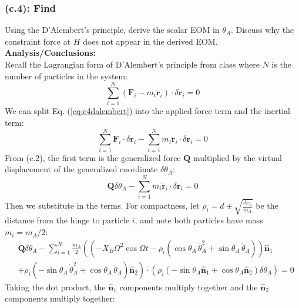 \documentclass[titlepage]{article}
\begin{document}
\subsubsection*{(c.4): Find}
Using the D'Alembert's principle, derive the scalar EOM in $\theta_A$. Discuss why the constraint force at $H$ does not appear in the derived EOM.\\

\textbf{Analysis/Conclusions:}\\
Recall the Lagrangian form of D'Alembert's principle from class where $N$ is the number of particles in the system:
\begin{equation}
	\sum_{i=1}^{N}\left(\boldsymbol{F}_i-m_i\ddot{\boldsymbol{r}}_i\right)\cdot\delta\boldsymbol{r}_i=0
	\label{eq:c4dalembert}
\end{equation}
We can split Eq. (\ref{eq:c4dalembert}) into the applied force term and the inertial term:
\begin{equation}
	\sum_{i=1}^{N}\boldsymbol{F}_i\cdot\delta\boldsymbol{r}_i-\sum_{i=1}^{N}m_i\ddot{\boldsymbol{r}}_i\cdot\delta\boldsymbol{r}_i=0
\end{equation}
From (c.2), the first term is the generalized force $\boldsymbol{Q}$ multiplied by the virtual displacement of the generalized coordinate $\delta\theta_A$:
\begin{equation}
	\boldsymbol{Q}\delta\theta_A-\sum_{i=1}^{N}m_i\ddot{\boldsymbol{r}}_i\cdot\delta\boldsymbol{r}_i=0
	\label{eq:c4split}
\end{equation}
Then we substitute in the terms. For compactness, let $\rho_i=d\pm\sqrt{\frac{J_{C_A}}{m_A}}$ be the distance from the hinge to particle $i$, and note both particles have mass $m_i=m_A/2$:
\begin{equation}
	\begin{split}
		&\boldsymbol{Q}\delta\theta_A-\sum_{i=1}^{N}\frac{m_A}{2}\left(\left(-X_B\Omega^2\cos\Omega t-\rho_i\left(\cos\theta_A\,\dot{\theta}_A^2+\sin\theta_A\,\ddot{\theta}_A\right)\right)\hat{\boldsymbol{n}}_1\right. \\
		&\left.+\rho_i\left(-\sin\theta_A\,\dot{\theta}_A^2+\cos\theta_A\,\ddot{\theta}_A\right)\hat{\boldsymbol{n}}_2\right)\cdot\left(\rho_i\left(-\sin\theta_A\hat{\boldsymbol{n}}_1+\cos\theta_A\hat{\boldsymbol{n}}_2\right)\delta\theta_A\right)=0
	\end{split}
\end{equation}
Taking the dot product, the $\hat{\boldsymbol{n}}_1$ components multiply together and the $\hat{\boldsymbol{n}}_2$ components multiply together:
\end{document}
